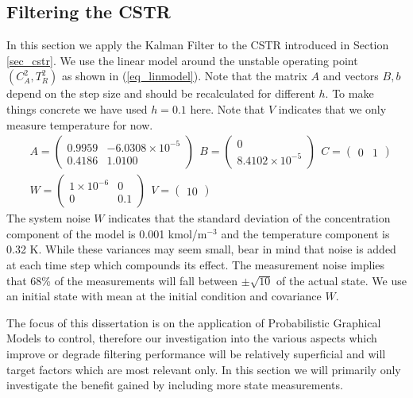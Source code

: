 \subsection{Filtering the CSTR}
\label{sec_filtering_linmods}
In this section we apply the Kalman Filter to the CSTR introduced in Section \ref{sec_cstr}. We use the linear model around the unstable operating point $(C_A^2, T_R^2)$ as shown in (\ref{eq_linmodel}). Note that the matrix $A$ and vectors $B, b$ depend on the step size and should be recalculated for different $h$. To make things concrete we have used $h=0.1$ here. Note that $V$ indicates that we only measure temperature for now.
\begin{equation}
\begin{aligned}
&A = \begin{pmatrix}
0.9959 & -6.0308\times 10^{-5} \\
0.4186 & 1.0100
\end{pmatrix} ~~
B = \begin{pmatrix}
0 \\ 8.4102\times 10^{-5}
\end{pmatrix} ~~
C = \begin{pmatrix}
0 & 1
\end{pmatrix} \\
&W = \begin{pmatrix}
1\times 10^{-6} & 0 \\ 0 & 0.1
\end{pmatrix} ~~
V = \begin{pmatrix}
10
\end{pmatrix}
\end{aligned}
\label{eq_linmodel}
\end{equation}
The system noise $W$ indicates that the standard deviation of the concentration component of the model is 0.001 kmol/m$^{-3}$ and the temperature component is 0.32 K. While these variances may seem small, bear in mind that noise is added at each time step which compounds its effect. The measurement noise implies that 68\% of the measurements will fall between $\pm\sqrt{10}$ of the actual state. We use an initial state with mean at the initial condition and covariance $W$.

The focus of this dissertation is on the application of Probabilistic Graphical Models to control, therefore our investigation into the various aspects which improve or degrade filtering performance will be relatively superficial and will target factors which are most relevant only. In this section we will primarily only investigate the benefit gained by including more state measurements.

